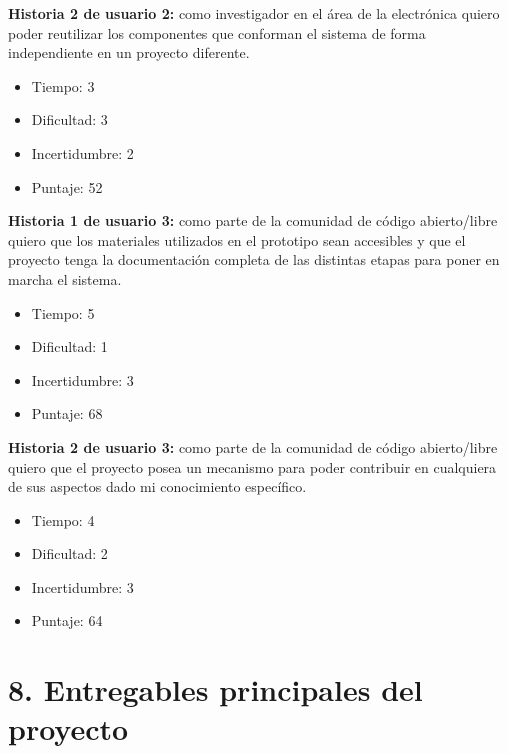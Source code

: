 \documentclass[
11pt, %
codirector, %
]{charter}
\begin{document}
\textbf{Historia 2 de usuario 2:} como investigador en el área de la electrónica quiero poder reutilizar los componentes que conforman el sistema de forma independiente en un proyecto diferente.

\begin{itemize}
	\item Tiempo: 3
	\item Dificultad: 3
	\item Incertidumbre: 2
	\item Puntaje: 52
\end{itemize}

\textbf{Historia 1 de usuario 3:} como parte de la comunidad de código abierto/libre quiero que los materiales utilizados en el prototipo sean accesibles y que el proyecto tenga la documentación completa de las distintas etapas para poner en marcha el sistema.

\begin{itemize}
	\item Tiempo: 5
	\item Dificultad: 1
	\item Incertidumbre: 3
	\item Puntaje: 68
\end{itemize}

\textbf{Historia 2 de usuario 3:} como parte de la comunidad de código abierto/libre quiero que el proyecto posea un mecanismo para poder contribuir en cualquiera de sus aspectos dado mi conocimiento específico.

\begin{itemize}
	\item Tiempo: 4
	\item Dificultad: 2
	\item Incertidumbre: 3
	\item Puntaje: 64
\end{itemize}

\section{8. Entregables principales del proyecto}
\label{sec:entregables}
\end{document}
